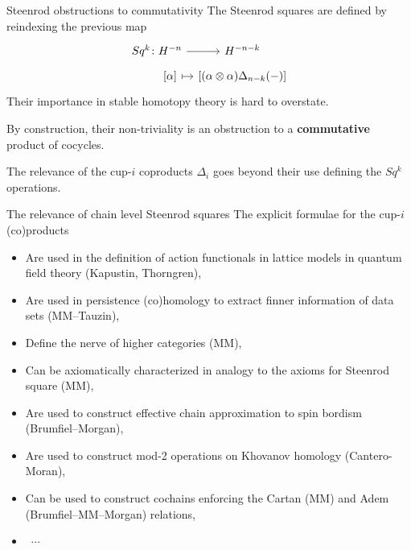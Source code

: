 \documentclass[10pt,t]{beamer}
\begin{document}
\begin{frame}[fragile]{Steenrod obstructions to commutativity}
	The Steenrod squares are defined by reindexing the previous map
	\begin{equation*}
	\begin{tikzcd}[row sep=tiny, column sep=tiny]
	Sq^k \colon H^{-n} \arrow[r] & H^{-n-k} \\
	\phantom{Sq^k \colon}{[\alpha]} \arrow[r, |->] & {\left[(\alpha \otimes \alpha)\Delta_{n-k}(-) \right]}
	\end{tikzcd}
	\end{equation*}
	Their importance in stable homotopy theory is hard to overstate.
	
	\pause \vspace{\baselineskip}
	
	By construction, their non-triviality is an obstruction to a \textbf{commutative} product of cocycles.
	
	\pause \vspace{\baselineskip}
	
	The relevance of the cup-$i$ coproducts $\Delta_i$ goes beyond their use defining the $Sq^k$ operations.
		
\end{frame}


\begin{frame}{The relevance of chain level Steenrod squares}
	The explicit formulae for the cup-$i$ (co)products	
	\begin{itemize}
		\item Are used in the definition of action functionals in lattice models in quantum field theory (Kapustin, Thorngren), \pause
		\item Are used in persistence (co)homology to extract finner information of data sets (MM--Tauzin), \pause
		\item Define the nerve of higher categories (MM), \pause
		\item Can be axiomatically characterized in analogy to the axioms for Steenrod square (MM), \pause
		\item Are used to construct effective chain approximation to spin bordism (Brumfiel--Morgan), \pause
		\item Are used to construct mod-2 operations on Khovanov homology (Cantero-Moran), \pause
		\item Can be used to construct cochains enforcing the Cartan (MM) and Adem (Brumfiel--MM--Morgan) relations,
		\item \ $\cdots$
	\end{itemize}
\end{frame}
\end{document}
